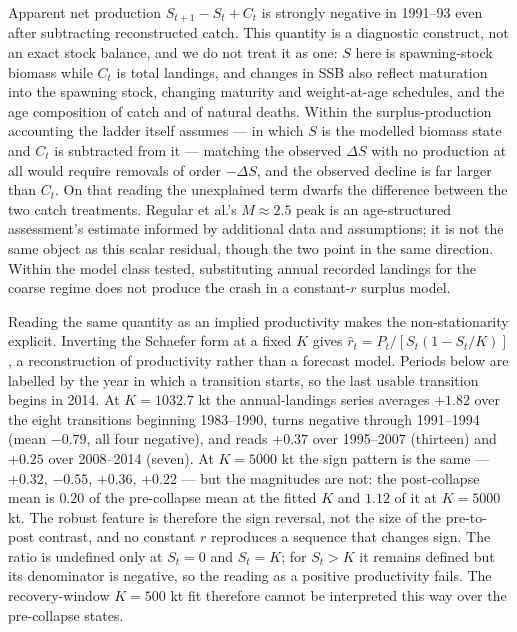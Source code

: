 \documentclass[11pt]{article}
\begin{document}
Apparent net production \(S_{t+1}-S_t+C_t\) is strongly negative in
1991--93 even after subtracting reconstructed catch. This quantity is a
diagnostic construct, not an exact stock balance, and we do not treat it
as one: \(S\) here is spawning-stock biomass while \(C_t\) is total
landings, and changes in SSB also reflect maturation into the spawning
stock, changing maturity and weight-at-age schedules, and the age
composition of catch and of natural deaths. Within the surplus-production
accounting the ladder itself assumes --- in which \(S\) is the modelled
biomass state and \(C_t\) is subtracted from it --- matching the observed
\(\Delta S\) with no production at all would require removals of order
\(-\Delta S\), and the observed decline is far larger than \(C_t\). On
that reading the unexplained term dwarfs the difference between the two
catch treatments.
Regular et al.'s \(M \approx 2.5\) peak is an age-structured assessment's
estimate informed by additional data and assumptions; it is not the same
object as this scalar residual, though the two point in the same
direction. Within the model class tested, substituting annual recorded landings
for the coarse regime does not produce the crash in a constant-\(r\)
surplus model.

Reading the same quantity as an implied productivity makes the
non-stationarity explicit. Inverting the Schaefer form at a fixed \(K\)
gives \(\hat r_t = P_t / [S_t(1-S_t/K)]\), a reconstruction of
productivity rather than a forecast model. Periods below are labelled by the year in which a transition starts, so
the last usable transition begins in 2014. At \(K = 1032.7\) kt the
annual-landings series averages \(+1.82\) over the eight transitions
beginning 1983--1990, turns negative through 1991--1994 (mean
\(-0.79\), all four negative), and reads \(+0.37\) over 1995--2007
(thirteen) and \(+0.25\) over 2008--2014 (seven). At \(K = 5000\) kt the
sign pattern is the same --- \(+0.32\), \(-0.55\), \(+0.36\),
\(+0.22\) --- but the magnitudes are not: the post-collapse mean is
\(0.20\) of the pre-collapse mean at the fitted \(K\) and \(1.12\) of
it at \(K = 5000\) kt. The robust feature is therefore the sign
reversal, not the size of the pre-to-post contrast, and no constant
\(r\) reproduces a sequence that changes sign.
The ratio is undefined only at \(S_t = 0\) and \(S_t = K\); for
\(S_t > K\) it remains defined but its denominator is negative, so the
reading as a positive productivity fails. The recovery-window
\(K = 500\) kt fit therefore cannot be interpreted this way over the
pre-collapse states.
\end{document}
